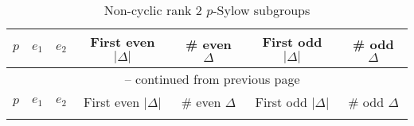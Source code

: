 \documentclass{mcom-l}
\theoremstyle{definition}
\begin{document}
\begin{longtable}[b]{| c | c | c || r | r | r | r |}
\caption{Non-cyclic rank 2 $p$-Sylow subgroups\label{tab:NC_2_p}}\\

\hline
$p$ & $e_1$	& $e_2$	& \multicolumn{1}{c|}{First even $|\Delta|$}		& \multicolumn{1}{c|}{\# even $\Delta$}	& \multicolumn{1}{c|}{First odd $|\Delta|$}	& \multicolumn{1}{c|}{\# odd $\Delta$}\\
\hline
\hline
\endfirsthead

\multicolumn{7}{c}{\normalsize{{\tablename~\thetable{}} -- continued from previous page}} \\
\hline
$p$ & $e_1$	& $e_2$	& \multicolumn{1}{c|}{First even $|\Delta|$}		& \multicolumn{1}{c|}{\# even $\Delta$}	& \multicolumn{1}{c|}{First odd $|\Delta|$}	& \multicolumn{1}{c|}{\# odd $\Delta$}\\
\hline
\hline
\endhead

\hline
\endfoot

\hline
\endlastfoot


\end{longtable}
\end{document}
